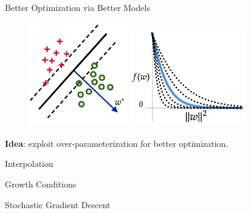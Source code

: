 \documentclass[mathserif,notheorems, hyperref={colorlinks, urlcolor=blue, linkcolor=blue}]{beamer}
\begin{document}
    \begin{frame}{Better Optimization via Better Models}

        \begin{figure}
            \centering
            \includegraphics[width=0.38\textwidth]{figures/separable}
            \hspace{0.2em}
            \includegraphics[width=0.45\textwidth]{figures/loss_fn}
        \end{figure}
        \vspace{0.2em}

        \begin{center}
            \large \textbf{Idea}: exploit over-parameterization for better optimization.\vspace{0.25em}
        \end{center}

    \end{frame}


    \begin{frame}{Interpolation}
        
    \end{frame}

    \begin{frame}{Growth Conditions}
        
    \end{frame}

    \begin{frame}{Stochastic Gradient Descent}
        
    \end{frame}
    
\end{document}
